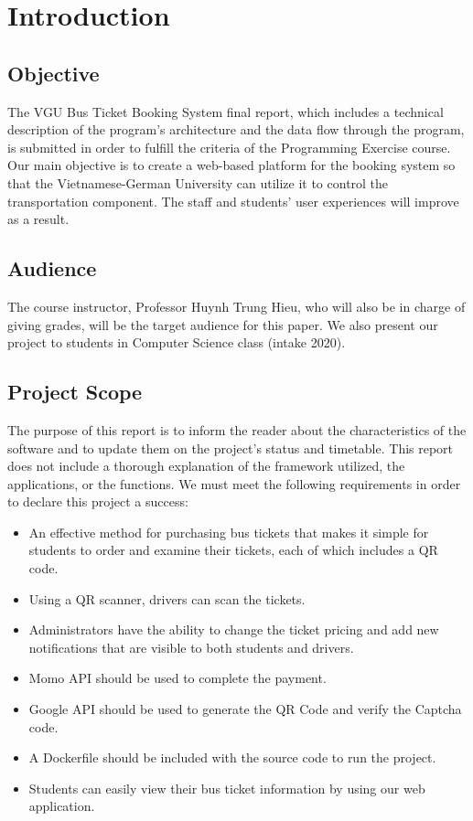 \section{Introduction}

\subsection{Objective}
\noindent The VGU Bus Ticket Booking System final report, which includes a technical description of the program's architecture and the data flow through the program, is submitted in order to fulfill the criteria of the Programming Exercise course. Our main objective is to create a web-based platform for the booking system so that the Vietnamese-German University can utilize it to control the transportation component. The staff and students' user experiences will improve as a result.

\subsection{Audience}
\noindent The course instructor, Professor Huynh Trung Hieu, who will also be in charge of giving grades, will be the target audience for this paper. We also present our project to students in Computer Science class (intake 2020).

\subsection{Project Scope}
\noindent The purpose of this report is to inform the reader about the characteristics of the software and to update them on the project's status and timetable. This report does not include a thorough explanation of the framework utilized, the applications, or the functions. We must meet the following requirements in order to declare this project a success:
\begin{itemize}
    \item An effective method for purchasing bus tickets that makes it simple for students to order and examine their tickets, each of which includes a QR code.
    \item Using a QR scanner, drivers can scan the tickets.
    \item Administrators have the ability to change the ticket pricing and add new notifications that are visible to both students and drivers.
    \item Momo API should be used to complete the payment.
    \item Google API should be used to generate the QR Code and verify the Captcha code.
    \item A Dockerfile should be included with the source code to run the project.
    \item Students can easily view their bus ticket information by using our web application.
\end{itemize}

